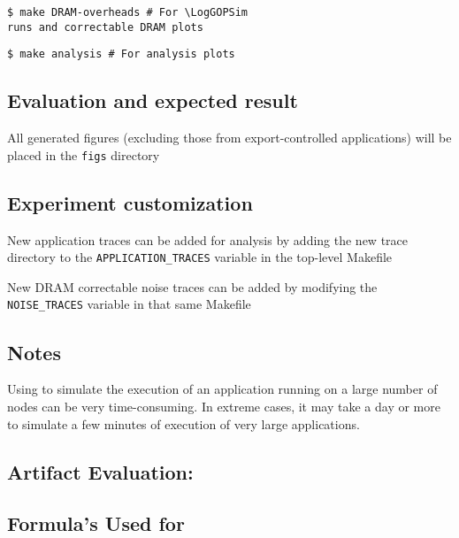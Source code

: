\begin{Verbatim}[commandchars=\\\{\},frame=single]
  $ make DRAM-overheads # For \LogGOPSim
runs and correctable DRAM plots
\end{Verbatim}

\begin{Verbatim}[commandchars=\\\{\},frame=single]
  $ make analysis # For analysis plots
\end{Verbatim}

\subsection{Evaluation and expected result}

All generated figures (excluding those from export-controlled applications) will
be placed in the {\texttt{figs}} directory

\subsection{Experiment customization}

New application traces can be added for analysis by adding the new trace
directory to the {\texttt{APPLICATION\_TRACES}} variable in the top-level Makefile

New DRAM correctable noise traces can be added by modifying the
{\texttt{NOISE\_TRACES}} variable in that same Makefile

\subsection{Notes}

Using \LogGOPSim to simulate the execution of an application running on 
a large number of nodes can be very time-consuming.  In extreme cases,
it may take a day or more to simulate a few minutes of execution of
very large applications.

\subsection{Artifact Evaluation: \myTitle}

\subsection{Formula's Used for }
